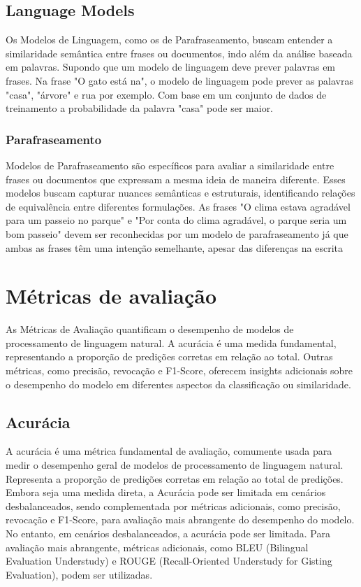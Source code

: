 \subsection{Language Models}
Os Modelos de Linguagem, como os de Parafraseamento, buscam entender a similaridade semântica entre frases ou documentos, indo além da análise baseada em palavras. Supondo que um modelo de linguagem deve prever palavras em frases. Na frase "O gato está na", o modelo de linguagem pode prever as palavras "casa", "árvore" e rua por exemplo. Com base em um conjunto de dados de treinamento a probabilidade da palavra "casa" pode ser maior.

\subsubsection{Parafraseamento}
Modelos de Parafraseamento são específicos para avaliar a similaridade entre frases ou documentos que expressam a mesma ideia de maneira diferente. Esses modelos buscam capturar nuances semânticas e estruturais, identificando relações de equivalência entre diferentes formulações. As frases "O clima estava agradável para um passeio no parque" e "Por conta do clima agradável, o parque seria um bom passeio" devem ser reconhecidas por um modelo de parafraseamento já que ambas as frases têm uma intenção semelhante, apesar das diferenças na escrita

\section{Métricas de avaliação}
As Métricas de Avaliação quantificam o desempenho de modelos de processamento de linguagem natural. A acurácia é uma medida fundamental, representando a proporção de predições corretas em relação ao total. Outras métricas, como precisão, revocação e F1-Score, oferecem insights adicionais sobre o desempenho do modelo em diferentes aspectos da classificação ou similaridade.

\subsection{Acurácia}
A acurácia é uma métrica fundamental de avaliação, comumente usada para medir o desempenho geral de modelos de processamento de linguagem natural. Representa a proporção de predições corretas em relação ao total de predições. Embora seja uma medida direta, a Acurácia pode ser limitada em cenários desbalanceados, sendo complementada por métricas adicionais, como precisão, revocação e F1-Score, para avaliação mais abrangente do desempenho do modelo. No entanto, em cenários desbalanceados, a acurácia pode ser limitada. Para avaliação mais abrangente, métricas adicionais, como BLEU (Bilingual Evaluation Understudy) e ROUGE (Recall-Oriented Understudy for Gisting Evaluation), podem ser utilizadas.

